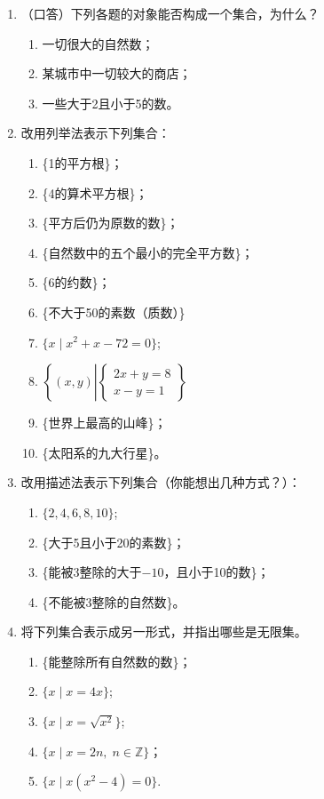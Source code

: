 \begin{enumerate}
    \item （口答）下列各题的对象能否构成一个集合，为什么？
\begin{enumerate}[(1)]
\item 一切很大的自然数；
\item 某城市中一切较大的商店；
\item 一些大于2且小于5的数。
\end{enumerate}

\item 改用列举法表示下列集合：
\begin{enumerate}[(1)]
\item \{1的平方根\}；
\item \{4的算术平方根\}；
\item \{平方后仍为原数的数\}；
\item \{自然数中的五个最小的完全平方数\}；
\item \{6的约数\}；
\item \{不大于50的素数（质数）\}
\item $\{x\mid x^2+x-72=0\}$;
    \item $\left\{(x,y)\left|\begin{cases}
    2x+y=8 \\x-y=1
    \end{cases}\right.\right\}$ 
    \item \{世界上最高的山峰\}；
    \item \{太阳系的九大行星\}。  
\end{enumerate}

\item 改用描述法表示下列集合（你能想出几种方式？）：
\begin{enumerate}[(1)]
    \item $\{2,4,6,8,10\}$;
    \item \{大于5且小于20的素数\}；
    \item \{能被3整除的大于$-10$，且小于10的数\}；
    \item \{不能被3整除的自然数\}。
\end{enumerate}

\item 将下列集合表示成另一形式，并指出哪些是无限集。
\begin{enumerate}[(1)]
\item \{能整除所有自然数的数\}；
\item $\{x\mid x=4x\}$;
\item $\{x\mid x=\sqrt{x^2}\}$;
\item $\{x\mid x=2n,\; n\in\mathbb{Z}\}$；
\item $\{x\mid x(x^2-4)=0\}$.
\end{enumerate}


\end{enumerate}
